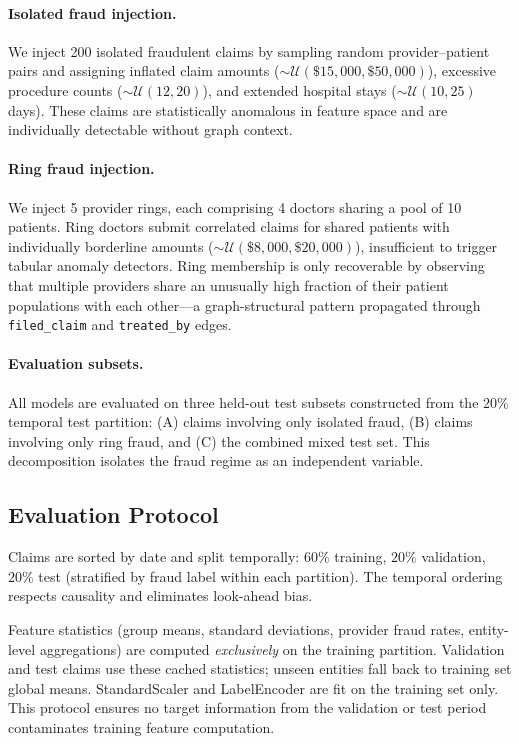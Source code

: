 \documentclass[pdflatex,sn-mathphys-num]{sn-jnl}
\theoremstyle{thmstyleone}
\theoremstyle{thmstyletwo}
\theoremstyle{thmstylethree}
\begin{document}
\paragraph{Isolated fraud injection.}
We inject 200 isolated fraudulent claims by sampling random
provider--patient pairs and assigning inflated claim amounts
($\sim\mathcal{U}(\$15{,}000, \$50{,}000)$), excessive procedure counts
($\sim\mathcal{U}(12, 20)$), and extended hospital stays
($\sim\mathcal{U}(10, 25)$ days). These claims are statistically
anomalous in feature space and are individually detectable without
graph context.

\paragraph{Ring fraud injection.}
We inject 5 provider rings, each comprising 4 doctors sharing a pool of
10 patients. Ring doctors submit correlated claims for shared patients
with individually borderline amounts ($\sim\mathcal{U}(\$8{,}000,
\$20{,}000)$), insufficient to trigger tabular anomaly detectors. Ring
membership is only recoverable by observing that multiple providers
share an unusually high fraction of their patient populations with each
other---a graph-structural pattern propagated through
\texttt{filed\_claim} and \texttt{treated\_by} edges.

\paragraph{Evaluation subsets.}
All models are evaluated on three held-out test subsets constructed
from the $20\%$ temporal test partition: (A) claims involving only
isolated fraud, (B) claims involving only ring fraud, and (C) the
combined mixed test set. This decomposition isolates the fraud regime
as an independent variable.

\subsection{Evaluation Protocol}\label{sec:protocol}

Claims are sorted by date and split temporally: $60\%$ training, $20\%$
validation, $20\%$ test (stratified by fraud label within each
partition). The temporal ordering respects causality and eliminates
look-ahead bias.

Feature statistics (group means, standard deviations, provider fraud
rates, entity-level aggregations) are computed \emph{exclusively} on
the training partition. Validation and test claims use these cached
statistics; unseen entities fall back to training set global means.
StandardScaler and LabelEncoder are fit on the training set only. This
protocol ensures no target information from the validation or test
period contaminates training feature computation.
\end{document}
